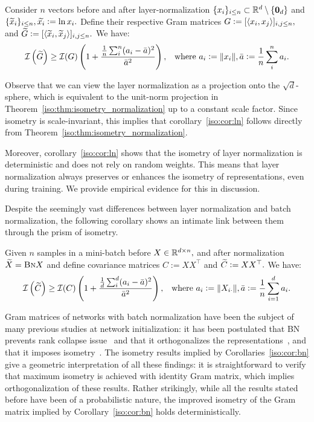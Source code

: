 \begin{corollary} \label{iso:cor:ln}
Consider $n$ vectors before and after layer-normalization $\{x_i\}_{i\le n}\subset \mathbb{R}^d\setminus\{\bm{0}_d\}$ and $\{\widetilde{x}_i\}_{i\le n}, \widetilde{x_i}:=\ln{x_i}.$
Define their respective Gram matrices $G := [\langle x_i,x_j\rangle]_{i,j\le n},$ and $\widetilde{G}:=[\langle \widetilde{x}_i,\widetilde{x}_j\rangle]_{i,j\le n}.$ We have:
\begin{align*}
 \mathcal{I}\left(\widetilde{G}\right) \ge \mathcal{I}(G)\left(1+\frac{\frac1n \sum_i^n(a_i-\bar{a})^2}{\bar{a}^2}\right), && \text{where } a_i:=\lVert x_i\rVert,\bar{a}:=\frac1n\sum_i^n a_i. 
\end{align*}
\end{corollary}

Observe that we can view the layer normalization as a projection onto the $\sqrt{d}$-sphere, which is equivalent to the unit-norm projection in Theorem~\ref{iso:thm:isometry_normalization} up to a constant scale factor. Since isometry is scale-invariant, this implies that corollary~\ref{iso:cor:ln} follows directly from Theorem~\ref{iso:thm:isometry_normalization}. 

Moreover, corollary~\ref{iso:cor:ln} shows that the isometry of layer normalization is deterministic and does not rely on random weights. This means that layer normalization always preserves or enhances the isometry of representations, even during training. We provide empirical evidence for this in discussion.

Despite the seemingly vast differences between layer normalization and batch normalization, the following corollary shows an intimate link between them through the prism of isometry. 

\begin{corollary} \label{iso:cor:bn}
 Given $n$ samples in a mini-batch before $X\in\mathbb{R}^{d\times n},$ and after normalization $\widetilde{X}=\text{\sc{Bn}}{X}$
 and define covariance matrices $C := X X^\top $ and $\widetilde{C}:=X X^\top. $ We have:
\begin{align*}
 \mathcal{I}\left(\widetilde{C}\right) \ge \mathcal{I}(C)\left(1+\frac{\frac1d \sum_i^d(a_i-\bar{a})^2}{\bar{a}^2}\right), && \text{where } a_i:=\lVert X_{i\cdot}\rVert,\bar{a}:=\frac1n\sum_{i=1}^d a_i. 
\end{align*}
\end{corollary}

Gram matrices of networks with batch normalization have been the subject of many previous studies at network initialization: it has been postulated that BN prevents rank collapse issue~\citep{daneshmand2020batch} and that it orthogonalizes the representations~\citep{daneshmand2021batch}, and that it imposes isometry~\citep{yang2018a}. The isometry results implied by Corollaries~\ref{iso:cor:bn} give a geometric interpretation of all these findings: it is straightforward to verify that maximum isometry is achieved with identity Gram matrix, which implies orthogonalization of these results. Rather strikingly, while all the results stated before have been of a probabilistic nature, the improved isometry of the Gram matrix implied by Corollary~\ref{iso:cor:bn} holds deterministically.
